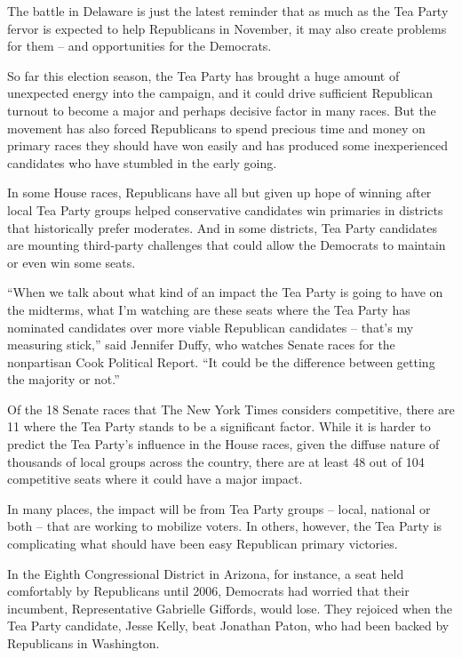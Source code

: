 ﻿\documentclass[12pt]{article}
\begin{document}
The battle in Delaware is just the latest reminder that as much as the Tea Party fervor is expected
to help Republicans in November, it may also create problems for them -- and opportunities for the
Democrats.

So far this election season, the Tea Party has brought a huge amount of unexpected energy into the
campaign, and it could drive sufficient Republican turnout to become a major and perhaps decisive
factor in many races. But the movement has also forced Republicans to spend precious time and money
on primary races they should have won easily and has produced some inexperienced candidates who have
stumbled in the early going.

In some House races, Republicans have all but given up hope of winning after local Tea Party groups
helped conservative candidates win primaries in districts that historically prefer moderates. And in
some districts, Tea Party candidates are mounting third-party challenges that could allow the
Democrats to maintain or even win some seats.

``When we talk about what kind of an impact the Tea Party is going to have on the midterms, what I'm
watching are these seats where the Tea Party has nominated candidates over more viable Republican
candidates -- that's my measuring stick,'' said Jennifer Duffy, who watches Senate races for the
nonpartisan Cook Political Report. ``It could be the difference between getting the majority or
not.''

Of the 18 Senate races that The New York Times considers competitive, there are 11 where the Tea
Party stands to be a significant factor. While it is harder to predict the Tea Party's influence in
the House races, given the diffuse nature of thousands of local groups across the country, there are
at least 48 out of 104 competitive seats where it could have a major impact.

In many places, the impact will be from Tea Party groups -- local, national or both -- that are
working to mobilize voters. In others, however, the Tea Party is complicating what should have been
easy Republican primary victories.

In the Eighth Congressional District in Arizona, for instance, a seat held comfortably by
Republicans until 2006, Democrats had worried that their incumbent, Representative Gabrielle
Giffords, would lose. They rejoiced when the Tea Party candidate, Jesse Kelly, beat Jonathan Paton,
who had been backed by Republicans in Washington.
\end{document}
